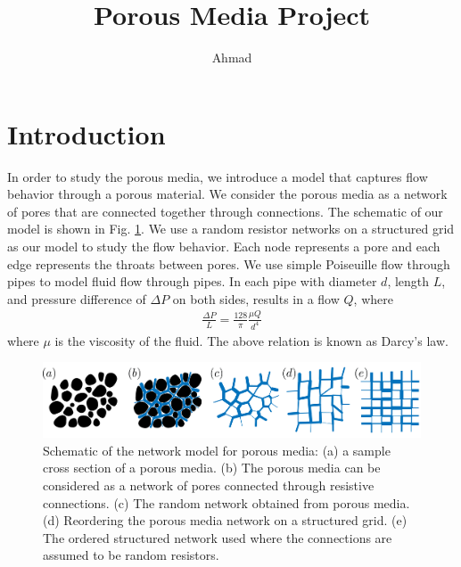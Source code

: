 
\def\d{\text{d}}
\def\vep{\varepsilon}
\def\ep{\epsilon}
\def\la{\langle}
\def\ra{\rangle}
\def\th{\theta}
\usepackage{tikz}
\usepackage{circuitikz}
\usepackage{float}
\usepackage{hyperref}
\newcommand{\AZ}[1]{{\color{red}{Ahmad: #1}}}
\newcommand{\red}[1]{{\color{red}{#1}}}
\title{Porous Media Project}
\author{Ahmad}
\date{}


\maketitle

\tableofcontents


\section{Introduction}
%
In order to study the porous media, we introduce a model that captures
flow behavior through a porous material. We consider the porous media
as a network of pores that are connected together through
connections. The schematic of our model is shown in
Fig. \ref{porous-schematic}. We use a random resistor networks on a
structured grid as our model to study the flow behavior. Each node
represents a pore and each edge represents the throats between
pores. We use simple Poiseuille flow through pipes to model fluid flow
through pipes. In each pipe with diameter $d$, length $L$, and pressure difference
of $\Delta P$ on both sides, results in a flow $Q$, where
%
\begin{align}
    \frac{\Delta P}{L}  = \frac{128}{\pi} \frac{\mu Q}{d^4} 
\end{align}
%
where $\mu$ is the viscosity of the fluid. The above relation is known
as Darcy's law. 

%
\begin{figure}[h]
  \centering
  \includegraphics[width=\textwidth]{./Figs/porous-schematic}
  \caption{Schematic of the network model for porous media: (a) a
    sample cross section of a porous media. (b) The porous media can
    be considered as a network of pores connected through resistive
    connections. (c) The random network obtained from porous
    media. (d) Reordering the porous media network on a structured
    grid. (e) The ordered structured network used where the
    connections are assumed to be random resistors.} \label{porous-schematic}
\end{figure}
%

